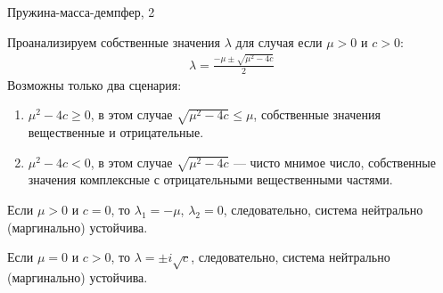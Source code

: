 \documentclass{beamer}
\begin{document}
\begin{frame}{Пружина-масса-демпфер, 2}
	\begin{flushleft}
		
		Проанализируем собственные значения $\lambda$ для случая если \textcolor{mydarkgreen}{$\mu > 0$} и \textcolor{mydarkgreen}{$ c > 0$}:
		\begin{align*}
			\lambda = \frac{-\mu \pm \sqrt{\mu^2 - 4 c} }{2}
		\end{align*}
		Возможны только два сценария: 
		
		\begin{enumerate}
			\item $\mu^2 - 4c \geq 0$, в этом случае $\sqrt{\mu^2 - 4c} \leq \mu$, собственные значения вещественные и \textcolor{mydarkgreen}{отрицательные}.
			\item $\mu^2 - 4c < 0$, в этом случае $\sqrt{\mu^2 - 4c}$ — чисто мнимое число, собственные значения комплексные с \textcolor{mydarkgreen}{отрицательными вещественными частями}.
		\end{enumerate}
		
		Если $\mu > 0$ и \textcolor{myblue}{$c = 0$}, то $\lambda_1 = -\mu$, $\lambda_2 = 0$, следовательно, система \textcolor{myblue}{нейтрально (маргинально) устойчива}.
		
		Если \textcolor{myblue}{$\mu = 0$} и $c > 0$, то $\lambda = \pm i \sqrt{c}$, следовательно, система \textcolor{myblue}{нейтрально (маргинально) устойчива}.
		
	\end{flushleft}
\end{frame}
\end{document}
